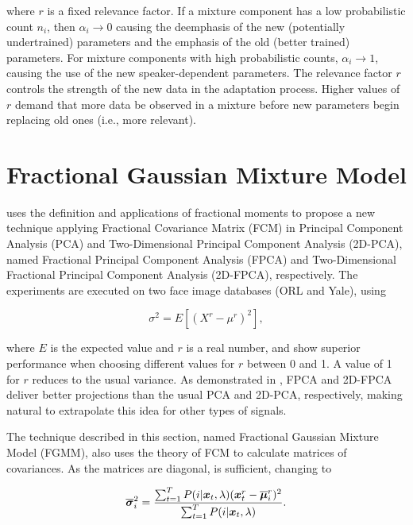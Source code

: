 \noindent where $r$ is a fixed relevance factor. If a mixture component has a low probabilistic count $n_i$, then $\alpha_i \to 0$ causing the deemphasis of the new (potentially undertrained) parameters and the emphasis of the old (better trained) parameters. For mixture components with high probabilistic counts, $\alpha_i \to 1$, causing the use of the new speaker-dependent parameters. The relevance factor $r$ controls the strength of the new data in the adaptation process. Higher values of $r$ demand that more data be observed in a mixture before new parameters begin replacing old ones (i.e., more relevant).

\section{Fractional Gaussian Mixture Model}
\label{sec:frac-gmm}

 uses the definition and applications of fractional moments to propose a new technique applying Fractional Covariance Matrix (FCM) in Principal Component Analysis (PCA) and Two-Dimensional Principal Component Analysis (2D-PCA), named Fractional Principal Component Analysis (FPCA) and Two-Dimensional Fractional Principal Component Analysis (2D-FPCA), respectively. The experiments are executed on two face image databases (ORL and Yale), using

\begin{equation}
    \sigma^2 = E[(X^r - \mu^r)^2],
    \label{eq:frac-variance}
\end{equation}

\noindent where $E$ is the expected value and $r$ is a real number, and show superior performance when choosing different values for $r$ between 0 and 1. A value of 1 for $r$ reduces  to the usual variance. As demonstrated in , FPCA and 2D-FPCA deliver better projections than the usual PCA and 2D-PCA, respectively, making natural to extrapolate this idea for other types of signals.

The technique described in this section, named Fractional Gaussian Mixture Model (FGMM), also uses the theory of FCM to calculate matrices of covariances. As the matrices are diagonal,  is sufficient, changing  to

\begin{equation}
    \overline{\dvec{\sigma}}_i^2 = \frac{\sum_{t=1}^T \postprob{i}{\dvec{x}_t, \lambda} (\dvec{x}_t^r - \overline{\dvec{\mu}}_i^r)^2}{\sum_{t=1}^T \postprob{i}{\dvec{x}_t, \lambda}}.
    \label{eq:m-step-frac-variances}
\end{equation}

